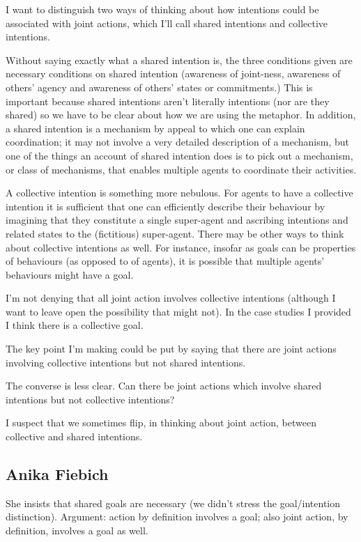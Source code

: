 \documentclass[12pt,a4paper]{extarticle}
\begin{document}
I want to distinguish two ways of thinking about how intentions could be associated with joint actions, which I'll call shared intentions and collective intentions.  

Without saying exactly what a shared intention is, the three conditions given are necessary conditions on shared intention (awareness of joint-ness, awareness of others' agency and awareness of others' states or commitments.)  This is important because shared intentions aren't literally intentions (nor are they shared) so we have to be clear about how we are using the metaphor.  In addition, a shared intention is a mechanism by appeal to which one can explain coordination; it may not involve a very detailed description of a mechanism, but one of the things an account of shared intention does is to pick out a mechanism, or class of mechanisms, that enables multiple agents to coordinate their activities.  

A collective intention is something more nebulous.  For agents to have a collective intention it is sufficient that one can efficiently describe their behaviour by imagining that they constitute a single super-agent and ascribing intentions and related states to the (fictitious) super-agent.    There may be other ways to think about collective intentions as well.  For instance, insofar as goals can be properties of behaviours (as opposed to of agents), it is possible that multiple agents' behaviours might have a goal.

I'm not denying that all joint action involves collective intentions (although I want to leave open the possibility that might not).  In the case studies I provided I think there is a collective goal.

The key point I'm making could be put by saying that there are joint actions involving collective intentions but not shared intentions.

The converse is less clear.  Can there be joint actions which involve shared intentions but not collective intentions?  

I suspect that we sometimes flip, in thinking about joint action, between collective and shared intentions.


\subsection{Anika Fiebich}
She insists that shared goals are necessary (we didn't stress the goal/intention distinction).  Argument: action by definition involves a goal; also joint action, by definition, involves a goal as well.  
\end{document}
